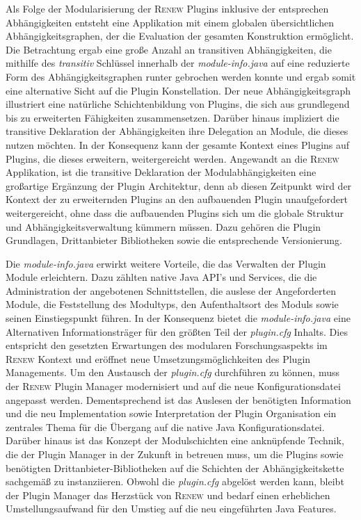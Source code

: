 Als Folge der Modularisierung der \textsc{Renew} Plugins inklusive der entsprechen Abhängigkeiten entsteht eine Applikation mit einem globalen übersichtlichen Abhängigkeitsgraphen, der die Evaluation der gesamten Konstruktion ermöglicht. Die Betrachtung ergab eine große Anzahl an transitiven Abhängigkeiten, die mithilfe des \textit{transitiv} Schlüssel innerhalb der \textit{module-info.java} auf eine reduzierte Form des Abhängigkeitsgraphen runter gebrochen werden konnte und ergab somit eine alternative Sicht auf die Plugin Konstellation. Der neue Abhängigkeitsgraph illustriert eine natürliche Schichtenbildung von Plugins, die sich aus grundlegend bis zu erweiterten Fähigkeiten zusammensetzen. Darüber hinaus impliziert die transitive Deklaration der Abhängigkeiten ihre Delegation an Module, die dieses nutzen möchten. In der Konsequenz kann der gesamte Kontext eines Plugins auf Plugins, die dieses erweitern, weitergereicht werden. \newline
Angewandt an die \textsc{Renew} Applikation, ist die transitive Deklaration der Modulabhängigkeiten eine großartige Ergänzung der Plugin Architektur, denn ab diesen Zeitpunkt wird der Kontext der zu erweiternden Plugins an den aufbauenden Plugin unaufgefordert weitergereicht, ohne dass die aufbauenden Plugins sich um die globale Struktur und Abhängigkeitsverwaltung kümmern müssen. Dazu gehören die Plugin Grundlagen, Drittanbieter Bibliotheken sowie die entsprechende Versionierung.\bigbreak

Die \textit{module-info.java} erwirkt weitere Vorteile, die das Verwalten der Plugin Module erleichtern. Dazu zählten native Java API's und Services, die die Administration der angebotenen Schnittstellen, die auslese der Angeforderten Module, die Feststellung des Modultyps, den Aufenthaltsort des Moduls sowie seinen Einstiegspunkt  führen. In der Konsequenz bietet die \textit{module-info.java} eine Alternativen Informationsträger für den größten Teil der \textit{plugin.cfg} Inhalts. Dies entspricht den gesetzten Erwartungen des modularen Forschungsaspekts im \textsc{Renew} Kontext und eröffnet neue Umsetzungsmöglichkeiten des Plugin Managements.\newline
Um den Austausch der \textit{plugin.cfg} durchführen zu können, muss der \textsc{Renew} Plugin Manager modernisiert und auf die neue Konfigurationsdatei angepasst werden. Dementsprechend ist das Auslesen der benötigten Information und die neu Implementation sowie Interpretation der Plugin Organisation ein zentrales Thema für die Übergang auf die native Java Konfigurationsdatei. Darüber hinaus ist das Konzept der Modulschichten eine anknüpfende Technik, die der Plugin Manager in der Zukunft in betreuen muss, um die Plugins sowie benötigten Drittanbieter-Bibliotheken auf die Schichten der Abhängigkeitskette sachgemäß zu instanziieren.\newline
Obwohl die \textit{plugin.cfg} abgelöst werden kann, bleibt der Plugin Manager das Herzstück von \textsc{Renew} und bedarf einen erheblichen Umstellungsaufwand für den Umstieg auf die neu eingeführten Java Features.\bigbreak

